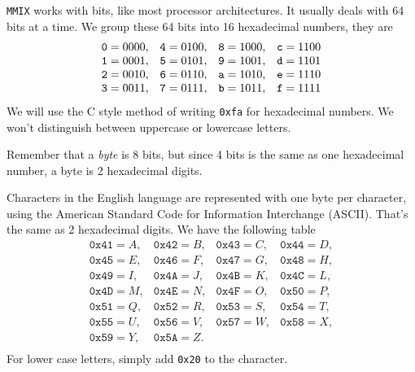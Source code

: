 
{\tt MMIX} works with bits, like most processor architectures. It
usually deals with 64 bits at a time. We group these 64 bits into
16 hexadecimal numbers, they are
\begin{equation}%
\begin{array}{llll}
\text{{\tt{0}}}=0000,&\text{{\tt{4}}}=0100,&\text{{\tt{8}}}=1000,&\text{{\tt{c}}}=1100\\
\text{{\tt{1}}}=0001,&\text{{\tt{5}}}=0101,&\text{{\tt{9}}}=1001,&\text{{\tt{d}}}=1101\\
\text{{\tt{2}}}=0010,&\text{{\tt{6}}}=0110,&\text{{\tt{a}}}=1010,&\text{{\tt{e}}}=1110\\
\text{{\tt{3}}}=0011,&\text{{\tt{7}}}=0111,&\text{{\tt{b}}}=1011,&\text{{\tt{f}}}=1111
\end{array}
\end{equation}
We will use the C style method of writing {\tt 0xfa} for
hexadecimal numbers. We won't distinguish between uppercase or
lowercase letters.

Remember that a \emph{byte} is 8 bits, but since 4 bits is the
same as one hexadecimal number, a byte is 2 hexadecimal digits.

Characters in the English language are represented with one byte
per character, using the American Standard Code for Information
Interchange (ASCII). That's the same as 2 hexadecimal digits.
We have the following table
\begin{equation}%
\begin{array}{llll}
\texttt{0x41}=A,&\texttt{0x42}=B,&\texttt{0x43}=C,&\texttt{0x44}=D,\\
\texttt{0x45}=E,&\texttt{0x46}=F,&\texttt{0x47}=G,&\texttt{0x48}=H,\\
\texttt{0x49}=I,&\texttt{0x4A}=J,&\texttt{0x4B}=K,&\texttt{0x4C}=L,\\
\texttt{0x4D}=M,&\texttt{0x4E}=N,&\texttt{0x4F}=O,&\texttt{0x50}=P,\\
\texttt{0x51}=Q,&\texttt{0x52}=R,&\texttt{0x53}=S,&\texttt{0x54}=T,\\
\texttt{0x55}=U,&\texttt{0x56}=V,&\texttt{0x57}=W,&\texttt{0x58}=X,\\
\texttt{0x59}=Y,&\texttt{0x5A}=Z.&&\\
\end{array}
\end{equation}
For lower case letters, simply add \texttt{0x20} to the
character.

